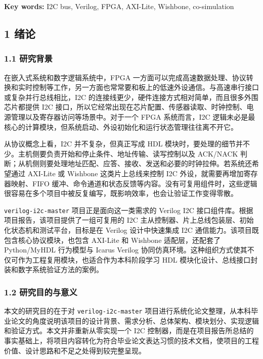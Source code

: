 \textbf{Key words:} I2C bus, Verilog, FPGA, AXI-Lite, Wishbone, co-simulation

\subsection{1 绪论}\label{ux7eeaux8bba}

\subsubsection{1.1 研究背景}\label{ux7814ux7a76ux80ccux666f}

在嵌入式系统和数字逻辑系统中，FPGA 一方面可以完成高速数据处理、协议转换和实时控制等工作，另一方面也常常要和板上的低速外设通信。与高速串行接口或复杂并行总线相比，I2C 的连接线更少，硬件连接方式相对简单，而且很多外围芯片都提供 I2C 接口，所以它经常出现在芯片配置、传感器读取、时钟控制、电源管理以及寄存器访问等场景中。对于一个 FPGA 系统而言，I2C 逻辑未必是最核心的计算模块，但系统启动、外设初始化和运行状态管理往往离不开它。

从协议概念上看，I2C 并不复杂，但真正写成 HDL 模块时，要处理的细节并不少。主机侧要负责开始和停止条件、地址传输、读写控制以及 ACK/NACK 判断；从机侧则要处理地址匹配、应答、接收、发送和必要的时钟拉伸。若系统还希望通过 AXI-Lite 或 Wishbone 这类片上总线来控制 I2C 外设，就需要再增加寄存器映射、FIFO 缓冲、命令通道和状态反馈等内容。没有可复用组件时，这些逻辑很容易在多个项目中被反复编写，既影响效率，也会让验证工作变得零散。

\texttt{verilog-i2c-master} 项目正是面向这一类需求的 Verilog I2C 接口组件库。根据项目报告，该项目提供了一组可复用的 I2C 主从控制器、片上总线包装层、初始化状态机和测试平台，目标是在 Verilog 设计中快速集成 I2C 通信能力。该项目既包含核心协议模块，也包含 AXI-Lite 和 Wishbone 适配层，还配套了 Python/MyHDL 行为模型与 Icarus Verilog 协同仿真环境。这种组织方式使其不仅可作为工程复用模块，也适合作为本科阶段学习 HDL 模块化设计、总线接口封装和数字系统验证方法的案例。

\subsubsection{1.2 研究目的与意义}\label{ux7814ux7a76ux76eeux7684ux4e0eux610fux4e49}

本文的研究目的在于对 \texttt{verilog-i2c-master} 项目进行系统化论文整理，从本科毕业论文的角度说明该项目的设计背景、需求分析、总体架构、模块划分、实现逻辑和验证方式。本文并非重新从零实现一个 I2C 控制器，而是在项目报告所总结的事实基础上，将项目内容转化为符合毕业论文表达习惯的技术文档，使项目的工程价值、设计思路和不足之处得到较完整呈现。

